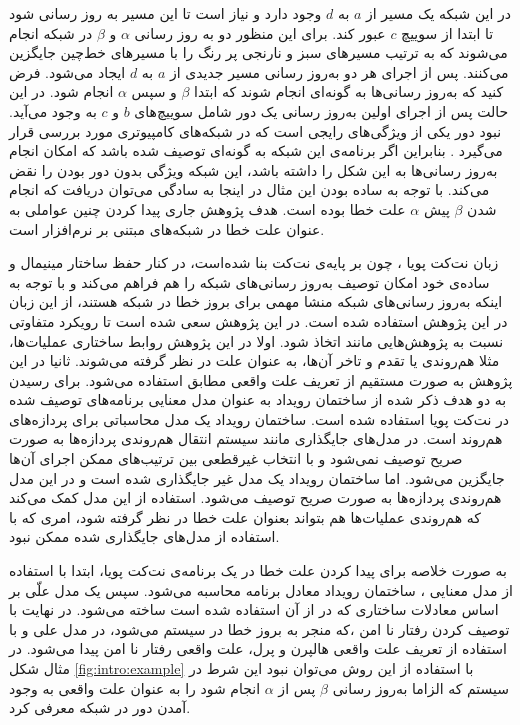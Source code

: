 در این شبکه یک مسیر از 
$a$
به 
$d$
وجود دارد و نیاز است تا این مسیر به روز رسانی شود تا ابتدا از سوییچ 
$c$
عبور کند. 
برای این منظور دو به روز رسانی 
$\alpha$
و
$\beta$
در شبکه انجام می‌شوند که به ترتیب مسیرهای سبز و نارنجی پر رنگ را با مسیر‌های خط‌چین جایگزین می‌کنند.
پس از اجرای هر دو به‌روز رسانی مسیر جدیدی از 
$a$
به 
$d$
ایجاد می‌شود.
فرض کنید که به‌روز رسانی‌ها به گونه‌ای انجام شوند که ابتدا 
$\beta$
و سپس
$\alpha$
انجام شود. 
در این حالت پس از اجرای اولین به‌روز رسانی یک دور
شامل سوییچ‌های 
$b$
و 
$c$
به وجود می‌آید.
نبود دور یکی از ویژگی‌های رایجی است که در شبکه‌های کامپیوتری مورد بررسی قرار می‌گیرد
\cite{network-abstractions}.
بنابراین اگر برنامه‌ی این شبکه به گونه‌ای توصیف شده باشد که امکان انجام به‌روز رسانی‌ها به این شکل را داشته باشد، این شبکه ویژگی بدون دور بودن را نقض می‌کند.
با توجه به ساده بودن این مثال در اینجا به سادگی می‌توان دریافت که انجام شدن 
$\beta$
پیش 
$\alpha$
علت خطا بوده است.
هدف پژوهش جاری پیدا کردن چنین عواملی به عنوان علت خطا در شبکه‌های مبتنی بر نرم‌افزار است.

زبان نت‌کت پویا
، چون بر پایه‌ی نت‌کت بنا شده‌است،
در کنار حفظ ساختار مینیمال و ساده‌ی خود امکان توصیف به‌روز رسانی‌های شبکه‌ را هم فراهم می‌کند
و با توجه به اینکه به‌روز رسانی‌های شبکه منشا مهمی برای بروز خطا در شبکه هستند، از این زبان در این پژوهش استفاده شده است.
در این پژوهش سعی شده است تا رویکرد متفاوتی نسبت به پژوهش‌هایی مانند
\cite{causality-checking,causal-hml,decomposing}
اتخاذ شود.
اولا در این پژوهش روابط ساختاری عملیات‌ها،
مثلا هم‌روندی یا تقدم و تاخر آن‌ها، به عنوان علت در نظر گرفته می‌شوند.
ثانیا در این پژوهش به صورت مستقیم از تعریف علت واقعی مطابق
\cite{hp}
استفاده می‌شود.
برای رسیدن به دو هدف ذکر شده از ساختمان رویداد
 \cite{es}
به عنوان مدل معنایی برنامه‌های توصیف شده در نت‌کت پویا استفاده شده است.
ساختمان رویداد یک مدل محاسباتی
برای پردازه‌های هم‌روند است.
در مدل‌های جایگذاری
مانند سیستم انتقال
هم‌روندی پردازه‌ها به صورت صریح توصیف نمی‌شود و با انتخاب غیرقطعی
بین ترتیب‌های ممکن اجرای آن‌ها جایگزین می‌شود.
اما ساختمان رویداد یک مدل غیر جایگذاری
شده است و در این مدل هم‌روندی پردازه‌ها به صورت صریح توصیف می‌شود.
استفاده از این مدل کمک می‌کند که هم‌روندی عملیات‌ها هم بتواند بعنوان علت خطا در نظر گرفته شود، امری که با استفاده از مدل‌های جایگذاری شده ممکن نبود. 

به صورت خلاصه برای پیدا کردن علت خطا در یک برنامه‌ی نت‌کت پویا، ابتدا با استفاده از مدل‌ معنایی
، ساختمان رویداد معادل برنامه محاسبه می‌شود. 
سپس یک مدل علّی
 بر اساس معادلات ساختاری
که در 
\cite{hp}
از آن استفاده شده است ساخته می‌شود.
در نهایت با توصیف کردن رفتار نا امن
،که منجر به بروز خطا در سیستم می‌شود، در مدل علی و با استفاده از تعریف علت واقعی هالپرن و پرل، علت واقعی رفتار نا امن پیدا می‌شود.
در مثال شکل 
\ref{fig:intro:example}
با استفاده از این روش می‌توان نبود این شرط در سیستم که الزاما به‌روز رسانی 
$\beta$
پس از 
$\alpha$
انجام شود را به عنوان علت واقعی به وجود آمدن دور در شبکه معرفی کرد.


